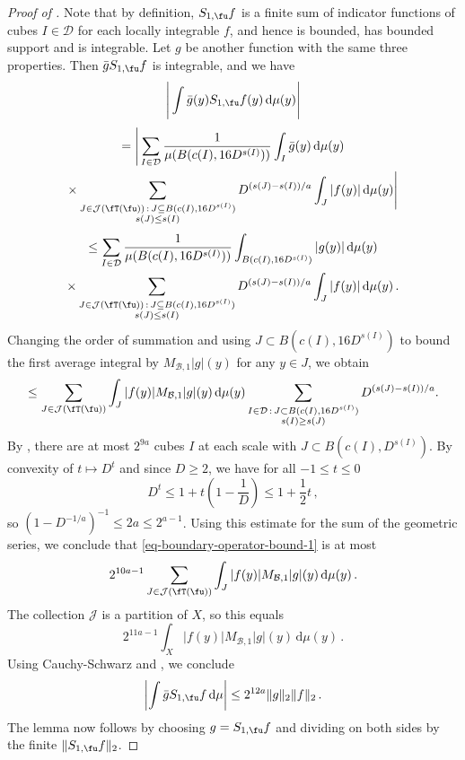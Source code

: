 \begin{proof}[Proof of ]
    Note that by definition, $S_{1,\fu}f$ is a finite sum of indicator functions of cubes $I \in \mathcal{D}$ for each locally integrable $f$, and hence is bounded, has bounded support and is integrable. Let $g$ be another function with the same three properties. Then $\bar g S_{1,\fu}f$ is integrable, and we have
    $$
        \Bigg|\int \bar g(y) S_{1,\fu}f(y) \, \mathrm{d}\mu(y)\Bigg|
    $$
    \begin{multline*}
        = \Bigg|\sum_{I\in\mathcal{D}} \frac{1}{\mu(B(c(I), 16 D^{s(I)}))} \int_I \bar g(y) \, \mathrm{d}\mu(y)\\
        \times \sum_{\substack{J\in \mathcal{J}(\fT(\fu))\,:\,J\subseteq B(c(I), 16 D^{s(I)})\\s(J)\le s(I)}} D^{(s(J)-s(I))/a}\int_J |f(y)| \,\mathrm{d}\mu(y)\Bigg|
    \end{multline*}
    \begin{multline*}
        \le \sum_{I\in\mathcal{D}} \frac{1}{\mu(B(c(I), 16D^{s(I)}))} \int_{B(c(I), 16D^{s(I)})} | g(y)| \, \mathrm{d}\mu(y)\\ \times \sum_{\substack{J\in \mathcal{J}(\fT(\fu))\,:\,J\subseteq B(c(I), 16 D^{s(I)})\\ s(J) \le s(I)}} D^{(s(J)-s(I))/a}\int_J |f(y)| \,\mathrm{d}\mu(y)\,.
    \end{multline*}
    Changing the order of summation and using $J \subset B(c(I), 16 D^{s(I)})$ to bound the first average integral by $M_{\mathcal{B},1}|g|(y)$ for any $y \in J$, we obtain
    \begin{align}
    \label{eq-boundary-operator-bound-1}
        \le \sum_{J\in\mathcal{J}(\fT(\fu))}\int_J|f(y)| M_{\mathcal{B},1}|g|(y) \, \mathrm{d}\mu(y) \sum_{\substack{I \in \mathcal{D} \, : \, J\subset B(c(I),16 D^{s(I)})\\ s(I) \ge s(J)}} D^{(s(J)-s(I))/a}.
    \end{align}
    By , there are at most $2^{9a}$ cubes $I$ at each scale with $J \subset B(c(I), D^{s(I)})$.
    By convexity of $t \mapsto D^t$ and since $D \ge 2$, we have for all $-1 \le t \le 0$
    $$
        D^t \le 1 + t\left(1 - \frac{1}{D}\right) \le 1 + \frac{1}{2}t\,,
    $$
    so $(1 - D^{-1/a})^{-1} \le 2a \le 2^{a-1}$.
    Using this estimate for the sum of the geometric series,
    we conclude that \eqref{eq-boundary-operator-bound-1} is at most
    $$
        2^{10a-1} \sum_{J\in\mathcal{J}(\fT(\fu))}\int_J|f(y)| M_{\mathcal{B},1}|g|(y) \, \mathrm{d}\mu(y)\,.
    $$
    The collection $\mathcal{J}$ is a partition of $X$, so this equals
    $$
        2^{11a-1} \int_X|f(y)| M_{\mathcal{B},1}|g|(y) \, \mathrm{d}\mu(y)\,.
    $$
    Using Cauchy-Schwarz and , we conclude
    $$
        \left|\int \bar g S_{1,\fu}f \, \mathrm{d}\mu \right| \le 2^{12a} \|g\|_2\|f\|_2\,.
    $$
    The lemma now follows by choosing $g = S_{1,\fu}f$ and dividing on both sides by the finite $\|S_{1,\fu}f\|_2$.
\end{proof}


